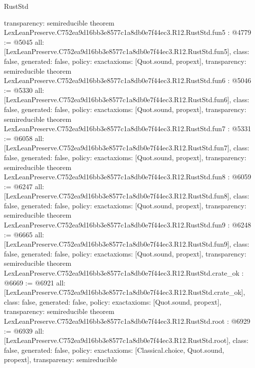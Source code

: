 \begin{lexlean}{RustStd}
\begin{coremodule}
{  transparency: semireducible
}
theorem LexLeanPreserve.C752ea9d16bb3e8577c1a8db0e7f44ec3.R12.RustStd.fun5 : @4779 := @5045 {
  all: [LexLeanPreserve.C752ea9d16bb3e8577c1a8db0e7f44ec3.R12.RustStd.fun5],
  class: false,
  generated: false,
  policy: exact{axioms: [Quot.sound, propext]},
  transparency: semireducible
}
theorem LexLeanPreserve.C752ea9d16bb3e8577c1a8db0e7f44ec3.R12.RustStd.fun6 : @5046 := @5330 {
  all: [LexLeanPreserve.C752ea9d16bb3e8577c1a8db0e7f44ec3.R12.RustStd.fun6],
  class: false,
  generated: false,
  policy: exact{axioms: [Quot.sound, propext]},
  transparency: semireducible
}
theorem LexLeanPreserve.C752ea9d16bb3e8577c1a8db0e7f44ec3.R12.RustStd.fun7 : @5331 := @6058 {
  all: [LexLeanPreserve.C752ea9d16bb3e8577c1a8db0e7f44ec3.R12.RustStd.fun7],
  class: false,
  generated: false,
  policy: exact{axioms: [Quot.sound, propext]},
  transparency: semireducible
}
theorem LexLeanPreserve.C752ea9d16bb3e8577c1a8db0e7f44ec3.R12.RustStd.fun8 : @6059 := @6247 {
  all: [LexLeanPreserve.C752ea9d16bb3e8577c1a8db0e7f44ec3.R12.RustStd.fun8],
  class: false,
  generated: false,
  policy: exact{axioms: [Quot.sound, propext]},
  transparency: semireducible
}
theorem LexLeanPreserve.C752ea9d16bb3e8577c1a8db0e7f44ec3.R12.RustStd.fun9 : @6248 := @6665 {
  all: [LexLeanPreserve.C752ea9d16bb3e8577c1a8db0e7f44ec3.R12.RustStd.fun9],
  class: false,
  generated: false,
  policy: exact{axioms: [Quot.sound, propext]},
  transparency: semireducible
}
theorem LexLeanPreserve.C752ea9d16bb3e8577c1a8db0e7f44ec3.R12.RustStd.crate_ok : @6669 := @6921 {
  all: [LexLeanPreserve.C752ea9d16bb3e8577c1a8db0e7f44ec3.R12.RustStd.crate_ok],
  class: false,
  generated: false,
  policy: exact{axioms: [Quot.sound, propext]},
  transparency: semireducible
}
theorem LexLeanPreserve.C752ea9d16bb3e8577c1a8db0e7f44ec3.R12.RustStd.root : @6929 := @6939 {
  all: [LexLeanPreserve.C752ea9d16bb3e8577c1a8db0e7f44ec3.R12.RustStd.root],
  class: false,
  generated: false,
  policy: exact{axioms: [Classical.choice, Quot.sound, propext]},
  transparency: semireducible
}


\end{coremodule}
\end{lexlean}
